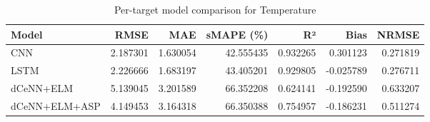 \begin{table}
\caption{Per-target model comparison for Temperature}
\begin{tabular}{lrrrrrr}
\toprule
Model & RMSE & MAE & sMAPE (\%) & R² & Bias & NRMSE \\
\midrule
CNN & 2.187301 & 1.630054 & 42.555435 & 0.932265 & 0.301123 & 0.271819 \\
LSTM & 2.226666 & 1.683197 & 43.405201 & 0.929805 & -0.025789 & 0.276711 \\
dCeNN+ELM & 5.139045 & 3.201589 & 66.352208 & 0.624141 & -0.192590 & 0.633207 \\
dCeNN+ELM+ASP & 4.149453 & 3.164318 & 66.350388 & 0.754957 & -0.186231 & 0.511274 \\
\bottomrule
\end{tabular}
\end{table}
